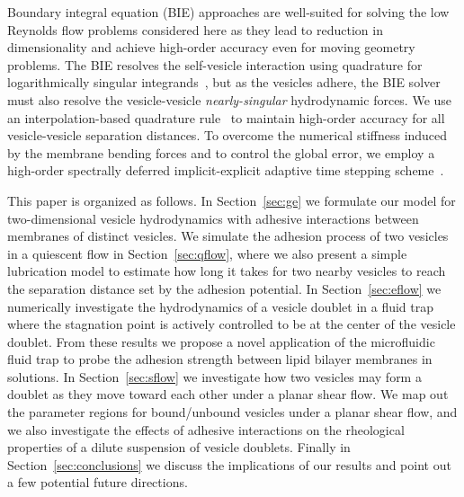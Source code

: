 \documentclass[prf,superscriptaddress,showpacs]{revtex4-1}
\begin{document}
Boundary integral equation (BIE) approaches are well-suited for solving
the low Reynolds flow problems considered here as they lead to reduction
in dimensionality and achieve high-order accuracy even for moving
geometry problems. The BIE resolves the self-vesicle interaction using
quadrature for logarithmically singular integrands~\cite{alp1999}, but
as the vesicles adhere, the BIE solver must also resolve the
vesicle-vesicle {\em nearly-singular} hydrodynamic forces.  We use an
interpolation-based quadrature rule~\cite{qua-bir2014} to maintain
high-order accuracy for all vesicle-vesicle separation distances.  To
overcome the numerical stiffness induced by the membrane bending forces
and to control the global error, we employ a high-order spectrally
deferred implicit-explicit adaptive time stepping
scheme~\cite{quaife2016adaptive}. 

This paper is organized as follows. In Section~\ref{sec:ge} we formulate
our model for two-dimensional vesicle hydrodynamics with adhesive
interactions between membranes of distinct vesicles.  We simulate the
adhesion process of two vesicles in a quiescent flow in
Section~\ref{sec:qflow}, where we also present a simple lubrication model to
estimate how long it takes for two nearby vesicles to reach the
separation distance set by the adhesion potential.
In Section~\ref{sec:eflow} we
numerically investigate the hydrodynamics of a vesicle doublet in a
fluid trap where the stagnation point is actively controlled to be at
the center of the vesicle doublet. From these results we propose a novel
application of the microfluidic fluid trap to probe the adhesion
strength between lipid bilayer membranes in solutions. In
Section~\ref{sec:sflow} we investigate how two vesicles may form a
doublet as they move toward each other under a planar shear flow.  We
map out the parameter regions for bound/unbound vesicles under a planar
shear flow, and we also investigate the effects of adhesive interactions
on the rheological properties of a dilute suspension of vesicle
doublets.  Finally in Section~\ref{sec:conclusions} we discuss the
implications of our results and point out a few potential future
directions.

\end{document}

